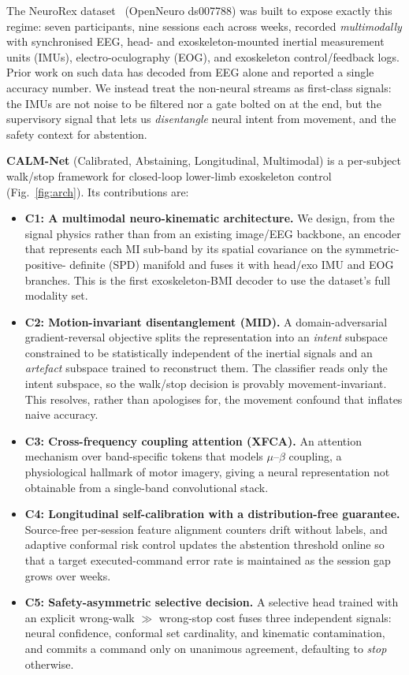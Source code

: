 \documentclass[journal]{IEEEtran}
\begin{document}
The NeuroRex dataset~\cite{sarkar2026} (OpenNeuro ds007788) was built to expose
exactly this regime: seven participants, nine sessions each across weeks, recorded
\emph{multimodally} with synchronised EEG, head- and exoskeleton-mounted inertial
measurement units (IMUs), electro-oculography (EOG), and exoskeleton control/feedback
logs. Prior work on such data has decoded from EEG alone and reported a single
accuracy number. We instead treat the non-neural streams as first-class signals: the
IMUs are not noise to be filtered nor a gate bolted on at the end, but the supervisory
signal that lets us \emph{disentangle} neural intent from movement, and the safety
context for abstention.

\textbf{CALM-Net} (Calibrated, Abstaining, Longitudinal, Multimodal) is a per-subject
walk/stop framework for closed-loop lower-limb exoskeleton control
(Fig.~\ref{fig:arch}). Its contributions are:
\begin{itemize}
\item \textbf{C1: A multimodal neuro-kinematic architecture.} We design, from the
signal physics rather than from an existing image/EEG backbone, an encoder that
represents each MI sub-band by its spatial covariance on the symmetric-positive-
definite (SPD) manifold and fuses it with head/exo IMU and EOG branches. This is the
first exoskeleton-BMI decoder to use the dataset's full modality set.
\item \textbf{C2: Motion-invariant disentanglement (MID).} A domain-adversarial
gradient-reversal objective splits the representation into an \emph{intent} subspace
constrained to be statistically independent of the inertial signals and an
\emph{artefact} subspace trained to reconstruct them. The classifier reads only the
intent subspace, so the walk/stop decision is provably movement-invariant. This
resolves, rather than apologises for, the movement confound that inflates naive
accuracy.
\item \textbf{C3: Cross-frequency coupling attention (XFCA).} An attention
mechanism over band-specific tokens that models $\mu$--$\beta$ coupling, a
physiological hallmark of motor imagery, giving a neural representation not obtainable
from a single-band convolutional stack.
\item \textbf{C4: Longitudinal self-calibration with a distribution-free
guarantee.} Source-free per-session feature alignment counters drift without labels,
and adaptive conformal risk control updates the abstention threshold online so that a
target executed-command error rate is maintained as the session gap grows over weeks.
\item \textbf{C5: Safety-asymmetric selective decision.} A selective head trained
with an explicit wrong-walk $\gg$ wrong-stop cost fuses three independent signals: 
neural confidence, conformal set cardinality, and kinematic contamination, and
commits a command only on unanimous agreement, defaulting to \emph{stop} otherwise.
\end{itemize}
\end{document}
